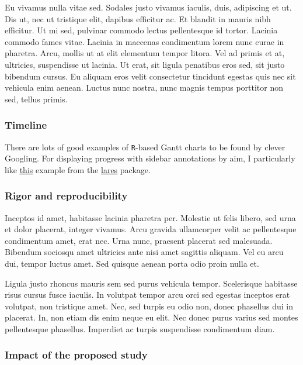 \documentclass[11pt,]{article}
\begin{document}
Eu vivamus nulla vitae sed. Sodales justo vivamus iaculis, duis,
adipiscing et ut. Dis ut, nec ut tristique elit, dapibus efficitur ac.
Et blandit in mauris nibh efficitur. Ut mi sed, pulvinar commodo lectus
pellentesque id tortor. Lacinia commodo fames vitae. Lacinia in maecenas
condimentum lorem nunc curae in pharetra. Arcu, mollis ut at elit
elementum tempor litora. Vel ad primis et at, ultricies, suspendisse ut
lacinia. Ut erat, sit ligula penatibus eros sed, sit justo bibendum
cursus. Eu aliquam eros velit consectetur tincidunt egestas quis nec sit
vehicula enim aenean. Luctus nunc nostra, nunc magnis tempus porttitor
non sed, tellus primis.

\hypertarget{timeline}{%
\subsubsection{Timeline}\label{timeline}}

There are lots of good examples of \texttt{R}-based Gantt charts to be
found by clever Googling. For displaying progress with sidebar
annotations by aim, I particularly like
\href{https://datascienceplus.com/visualize-your-cvs-timeline-with-r-gantt-style/}{\underline{this}}
example from the
\href{https://github.com/laresbernardo/lares}{\underline{lares}}
package.

\hypertarget{rigor-and-reproducibility}{%
\subsubsection{Rigor and
reproducibility}\label{rigor-and-reproducibility}}

Inceptos id amet, habitasse lacinia pharetra per. Molestie ut felis
libero, sed urna et dolor placerat, integer vivamus. Arcu gravida
ullamcorper velit ac pellentesque condimentum amet, erat nec. Urna nunc,
praesent placerat sed malesuada. Bibendum sociosqu amet ultricies ante
nisi amet sagittis aliquam. Vel eu arcu dui, tempor luctus amet. Sed
quisque aenean porta odio proin nulla et.

Ligula justo rhoncus mauris sem sed purus vehicula tempor. Scelerisque
habitasse risus cursus fusce iaculis. In volutpat tempor arcu orci sed
egestas inceptos erat volutpat, non tristique amet. Nec, sed turpis eu
odio non, donec phasellus dui in placerat. In, non etiam dis enim neque
eu elit. Nec donec purus varius sed montes pellentesque phasellus.
Imperdiet ac turpis suspendisse condimentum diam.

\hypertarget{impact-of-the-proposed-study}{%
\subsubsection{Impact of the proposed
study}\label{impact-of-the-proposed-study}}
\end{document}

